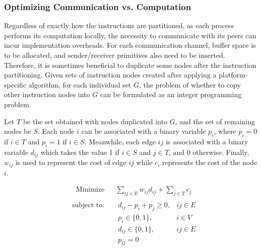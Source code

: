 \documentclass{sig-alternate}
\begin{document}

\subsubsection{Optimizing Communication vs. Computation}
\label{opt}
 Regardless of exactly how the instructions are partitioned, as each process performs its computation locally, the necessity to communicate with its peers can incur implementation overheads.
For each communication channel, buffer space is to be allocated, and sender/receiver primitives also need to be inserted. Therefore, it is sometimes beneficial to duplicate some nodes after the instruction partitioning. Given sets of instruction nodes created after applying a platform-specific algorithm, for each individual set $G$, the problem of whether to copy other instruction nodes into $G$ can be formulated as an integer programming problem. 

Let $T$ be the set obtained with nodes duplicated into $G$, and the set of remaining nodes be $S$. Each node $i$ can be associated with a binary variable $p_i$, where $p_i = 0$ if $i \in T$ and $p_i = 1$ if $i \in S$. Meanwhile, each edge $ij$ is associated with
a binary variable $d_{ij}$ which takes the value 1 if $i \in S$ and $j \in T$, and 0 otherwise. Finally, $w_{ij}$ is used to represent the cost of edge $ij$
while $c_i$ represents the cost of the node $i$.


\begin{equation}
\begin{aligned}
\label{ilpopt}
& {\text{Minimize}} & & \underset{ij \in E}\sum w_{ij}d_{ij} +  \underset{j \in T}\sum c_j \\
\end{aligned}
\end{equation}
\begin{equation*}
\begin{aligned}
& \text{subject to: }
& &  d_{ij} - p_i+p_j \ge 0, & ij \in E \\
& &  & p_i \in \{0,1\}, & i \in V \\
& & & d_{ij} \in \{0,1\}, & ij \in E \\
& & & p_{G} = 0
\end{aligned}
\end{equation*}
\end{document}

